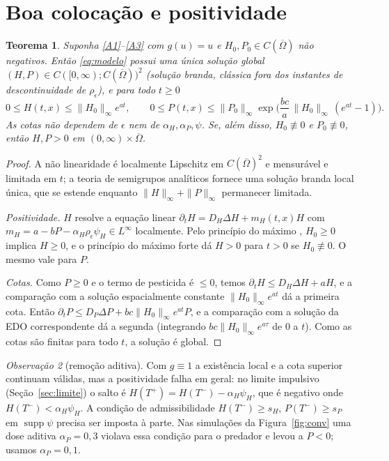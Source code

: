 \documentclass[11pt,a4paper]{article}
\numberwithin{equation}{section}
\newtheorem{teorema}{Teorema}[section]
\theoremstyle{definition}
\theoremstyle{remark}
\newtheorem{observacao}[teorema]{Observação}
\begin{document}
\section{Boa colocação e positividade}

\begin{teorema}\label{teo:existencia}
Suponha \ref{A1}--\ref{A3} com $g(u)=u$ e $H_0,P_0\in C(\overline\Omega)$ não negativos. Então
\eqref{eq:modelo} possui uma única solução global $(H,P)\in C([0,\infty);C(\overline\Omega))^2$
(solução branda, clássica fora dos instantes de descontinuidade de $\rho_\epsilon$), e para
todo $t\ge0$
\begin{equation}\label{eq:cotas}
0\le H(t,x)\le \|H_0\|_\infty e^{at},\qquad
0\le P(t,x)\le \|P_0\|_\infty \exp\!\Big(\frac{bc}{a}\,\|H_0\|_\infty\,(e^{at}-1)\Big).
\end{equation}
As cotas não dependem de $\epsilon$ nem de $\alpha_H,\alpha_P,\psi$. Se, além disso,
$H_0\not\equiv0$ e $P_0\not\equiv0$, então $H,P>0$ em $(0,\infty)\times\overline\Omega$.
\end{teorema}

\begin{proof}
A não linearidade é localmente Lipschitz em $C(\overline\Omega)^2$ e mensurável e limitada em $t$;
a teoria de semigrupos analíticos \cite{Henry,Pazy} fornece uma solução branda local
única, que se estende enquanto $\|H\|_\infty+\|P\|_\infty$ permanecer limitada.

\emph{Positividade.} $H$ resolve a equação linear
$\partial_tH=D_H\Delta H+m_H(t,x)H$ com $m_H=a-bP-\alpha_H\rho_\epsilon\psi_H\in L^\infty$
localmente. Pelo princípio do máximo \cite{ProtterWeinberger}, $H_0\ge0$ implica $H\ge0$,
e o princípio do máximo forte dá $H>0$ para $t>0$ se $H_0\not\equiv0$. O mesmo vale para $P$.

\emph{Cotas.} Como $P\ge0$ e o termo de pesticida é $\le0$, temos
$\partial_tH\le D_H\Delta H+aH$, e a comparação com a solução espacialmente
constante $\|H_0\|_\infty e^{at}$ dá a primeira cota. Então
$\partial_tP\le D_P\Delta P+bc\|H_0\|_\infty e^{at}P$, e a comparação com a solução da
EDO correspondente dá a segunda (integrando $bc\|H_0\|_\infty e^{a\tau}$ de $0$ a $t$). Como as cotas são finitas para todo $t$, a solução é global.
\end{proof}

\begin{observacao}[remoção aditiva]\label{obs:aditiva}
Com $g\equiv1$ a existência local e a cota superior continuam válidas, mas a positividade
falha em geral: no limite impulsivo (Seção~\ref{sec:limite}) o salto é
$H(T^+)=H(T^-)-\alpha_H\psi_H$, que é negativo onde $H(T^-)<\alpha_H\psi_H$. A condição de
admissibilidade $H(T^-)\ge s_H$, $P(T^-)\ge s_P$ em $\operatorname{supp}\psi$ precisa ser
imposta à parte. Nas simulações da Figura~\ref{fig:conv} uma dose aditiva
$\alpha_P=0{,}3$ violava essa condição para o predador e levou a $P<0$; usamos
$\alpha_P=0{,}1$.
\end{observacao}
\end{document}
